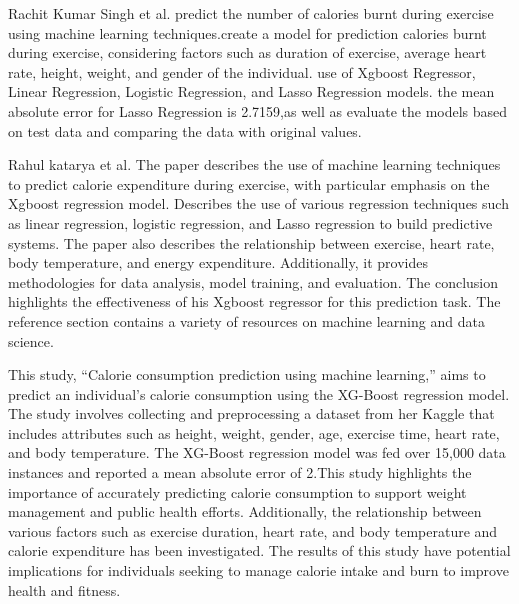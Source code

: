 \documentclass[conference]{IEEEtran}
\begin{document}
\newline
Rachit Kumar Singh et al.\textcolor{blue}{\citep{Rachit10}} predict the number of calories burnt during exercise using machine learning techniques.create a model for prediction calories burnt during exercise, considering factors such as duration of exercise, average heart rate, height, weight, and gender of the individual. use of Xgboost Regressor, Linear Regression, Logistic Regression, and Lasso Regression models. the mean absolute error for Lasso Regression is 2.7159,as well as evaluate the models based on test data and comparing the data with original values.
\newline 

\newline
Rahul katarya et al.\textcolor{blue}{\citep{katarya2021machine}} The paper describes the use of  machine learning techniques to predict calorie expenditure during exercise, with particular emphasis on the Xgboost regression model. Describes the use of various regression techniques such as linear regression, logistic regression, and Lasso regression to build predictive systems. The paper also describes the relationship between exercise, heart rate, body temperature, and energy expenditure. Additionally, it provides methodologies for data analysis, model training, and evaluation. The conclusion highlights the effectiveness of his Xgboost regressor for this prediction task. The reference section contains a variety of resources on machine learning and data science.
\newline 

\newline
This study, “Calorie consumption prediction using machine learning,” aims to predict an individual's calorie consumption using the XG-Boost regression model.
 The study involves collecting and preprocessing a dataset from her Kaggle that includes attributes such as height, weight, gender, age, exercise time, heart rate, and body temperature.
 The XG-Boost regression model was fed  over 15,000 data instances and reported a mean absolute error of 2.This study highlights the importance of accurately predicting calorie consumption to support weight management and public health efforts.
 Additionally,  the relationship between various factors such as exercise duration, heart rate, and body temperature and calorie expenditure has been investigated.
 The results of this study have potential implications for individuals seeking to manage  calorie intake and burn to improve health and fitness.
 \newline
\end{document}
